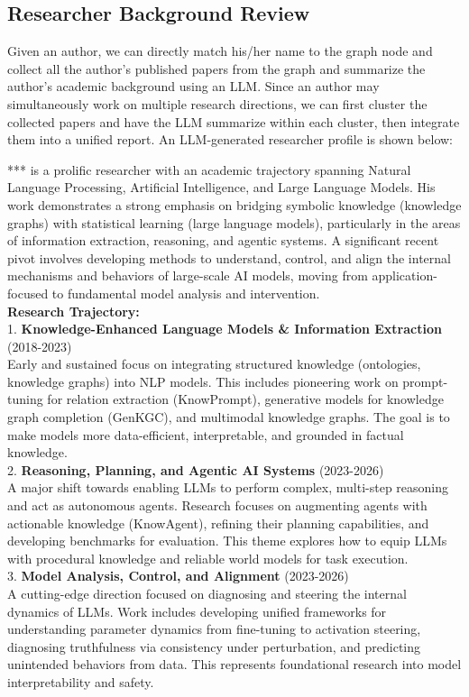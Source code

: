 \subsection{Researcher Background Review}
Given an author, we can directly match his/her name to the graph node and collect all the author's published papers from the graph and summarize the author's academic background using an LLM.
Since an author may simultaneously work on multiple research directions, we can first cluster the collected papers and have the LLM summarize within each cluster, then integrate them into a unified report.
An LLM-generated researcher profile is shown below:
\begin{tcolorbox}[breakable,colback=persona!20!white, colframe=persona!60!black, title=\textbf{Researcher Background Review}]
    \label{box:author_profile}
    *** is a prolific researcher with an academic trajectory spanning Natural Language Processing, Artificial Intelligence, and Large Language Models. His work demonstrates a strong emphasis on bridging symbolic knowledge (knowledge graphs) with statistical learning (large language models), particularly in the areas of information extraction, reasoning, and agentic systems. A significant recent pivot involves developing methods to understand, control, and align the internal mechanisms and behaviors of large-scale AI models, moving from application-focused to fundamental model analysis and intervention.\\
    \textbf{Research Trajectory:}\\
    1. \textbf{Knowledge-Enhanced Language Models \& Information Extraction} (2018-2023)\\
    Early and sustained focus on integrating structured knowledge (ontologies, knowledge graphs) into NLP models. This includes pioneering work on prompt-tuning for relation extraction (KnowPrompt), generative models for knowledge graph completion (GenKGC), and multimodal knowledge graphs. The goal is to make models more data-efficient, interpretable, and grounded in factual knowledge.\\
    2. \textbf{Reasoning, Planning, and Agentic AI Systems} (2023-2026)\\
    A major shift towards enabling LLMs to perform complex, multi-step reasoning and act as autonomous agents. Research focuses on augmenting agents with actionable knowledge (KnowAgent), refining their planning capabilities, and developing benchmarks for evaluation. This theme explores how to equip LLMs with procedural knowledge and reliable world models for task execution.\\
    3. \textbf{Model Analysis, Control, and Alignment} (2023-2026)\\
    A cutting-edge direction focused on diagnosing and steering the internal dynamics of LLMs. Work includes developing unified frameworks for understanding parameter dynamics from fine-tuning to activation steering, diagnosing truthfulness via consistency under perturbation, and predicting unintended behaviors from data. This represents foundational research into model interpretability and safety.
\end{tcolorbox}
